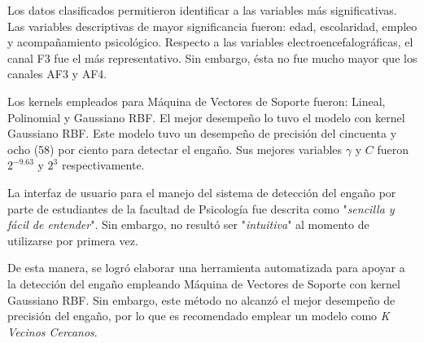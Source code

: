 Los datos clasificados permitieron identificar a las variables más significativas. Las variables descriptivas de mayor significancia fueron: edad, escolaridad, empleo y acompañamiento psicológico. Respecto a las variables electroencefalográficas, el canal F3 fue el más representativo. Sin embargo, ésta no fue mucho mayor que los canales AF3 y AF4. 

Los kernels empleados para Máquina de Vectores de Soporte fueron: Lineal, Polinomial y Gaussiano RBF. El mejor desempeño lo tuvo el modelo con kernel Gaussiano RBF. Este modelo tuvo un desempeño de precisión del cincuenta y ocho (58) por ciento para detectar el engaño. Sus mejores variables $\gamma$ y $C$ fueron $2^{-9.63}$ y $2^3$ respectivamente.

La interfaz de usuario para el manejo del sistema de detección del engaño por parte de estudiantes de la facultad de Psicología fue descrita como "\textit{sencilla y fácil de entender}". Sin embargo, no resultó ser "\textit{intuitiva}" al momento de utilizarse por primera vez.

De esta manera, se logró elaborar una herramienta automatizada para apoyar a la detección del engaño empleando Máquina de Vectores de Soporte con kernel Gaussiano RBF. Sin embargo, este método no alcanzó el mejor desempeño de precisión del engaño, por lo que es recomendado emplear un modelo como \textit{K Vecinos Cercanos}.